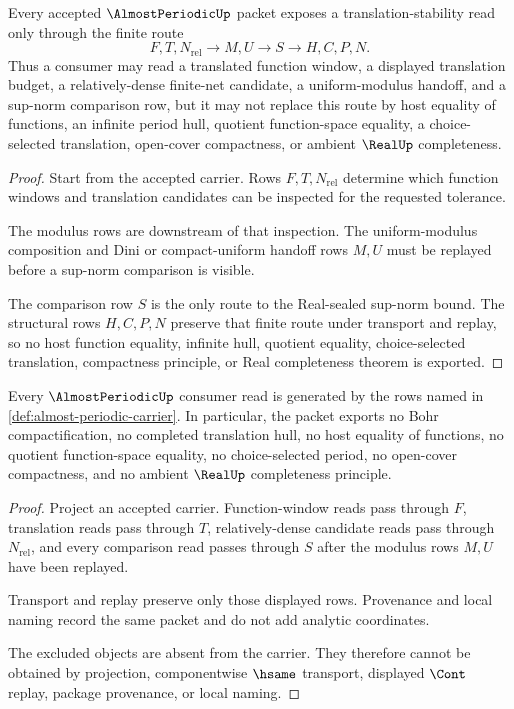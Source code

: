 \begin{theorem}
\label{thm:almost-periodic-supnorm-translation-stability}
Every accepted $\AlmostPeriodicUp$ packet exposes a translation-stability read only through the finite route
$$
F,T,N_{\mathrm{rel}} \longrightarrow M,U \longrightarrow S \longrightarrow H,C,P,N .
$$
Thus a consumer may read a translated function window, a displayed translation budget, a relatively-dense finite-net candidate, a uniform-modulus handoff, and a sup-norm comparison row, but it may not replace this route by host equality of functions, an infinite period hull, quotient function-space equality, a choice-selected translation, open-cover compactness, or ambient $\RealUp$ completeness.
\end{theorem}
\begin{proof}
Start from the accepted carrier. Rows $F,T,N_{\mathrm{rel}}$ determine which function windows and translation candidates can be inspected for the requested tolerance.

The modulus rows are downstream of that inspection. The uniform-modulus composition and Dini or compact-uniform handoff rows $M,U$ must be replayed before a sup-norm comparison is visible.

The comparison row $S$ is the only route to the Real-sealed sup-norm bound. The structural rows $H,C,P,N$ preserve that finite route under transport and replay, so no host function equality, infinite hull, quotient equality, choice-selected translation, compactness principle, or Real completeness theorem is exported.
\end{proof}

\begin{theorem}
\label{thm:almost-periodic-ledger-nonescape}
Every $\AlmostPeriodicUp$ consumer read is generated by the rows named in \autoref{def:almost-periodic-carrier}. In particular, the packet exports no Bohr compactification, no completed translation hull, no host equality of functions, no quotient function-space equality, no choice-selected period, no open-cover compactness, and no ambient $\RealUp$ completeness principle.
\end{theorem}
\begin{proof}
Project an accepted carrier. Function-window reads pass through $F$, translation reads pass through $T$, relatively-dense candidate reads pass through $N_{\mathrm{rel}}$, and every comparison read passes through $S$ after the modulus rows $M,U$ have been replayed.

Transport and replay preserve only those displayed rows. Provenance and local naming record the same packet and do not add analytic coordinates.

The excluded objects are absent from the carrier. They therefore cannot be obtained by projection, componentwise $\hsame$ transport, displayed $\Cont$ replay, package provenance, or local naming.
\end{proof}

